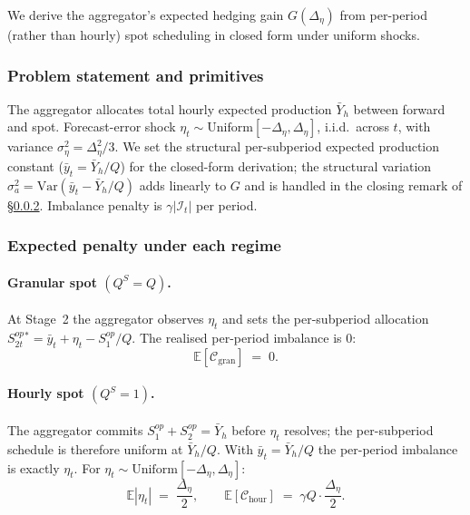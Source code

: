 \documentclass[11pt,a4paper]{article}
\theoremstyle{definition}
\theoremstyle{remark}
\theoremstyle{plain}
\begin{document}
We derive the aggregator's expected hedging gain $G(\Delta_\eta)$ from per-period (rather than hourly) spot scheduling in closed form under uniform shocks.

\subsubsection{Problem statement and primitives}\label{sec:aggregator-app:problem}
The aggregator allocates total hourly expected production $\bar Y_h$ between forward and spot. Forecast-error shock $\eta_t \sim \mathrm{Uniform}[-\Delta_\eta, \Delta_\eta]$, i.i.d.\ across $t$, with variance $\sigma_\eta^2 = \Delta_\eta^2/3$. We set the structural per-subperiod expected production constant ($\bar y_t = \bar Y_h/Q$) for the closed-form derivation; the structural variation $\sigma_a^2 = \mathrm{Var}(\bar y_t - \bar Y_h/Q)$ adds linearly to $G$ and is handled in the closing remark of \S\ref{sec:aggregator-app:gain}. Imbalance penalty is $\gamma|\mathcal{I}_t|$ per period.

\subsubsection{Expected penalty under each regime}\label{sec:aggregator-app:gain}
\paragraph{Granular spot $(Q^S = Q)$.} At Stage~2 the aggregator observes $\eta_t$ and sets the per-subperiod allocation $S_{2t}^{op}{}^* = \bar y_t + \eta_t - S_1^{op}/Q$. The realised per-period imbalance is $0$:
\[
\mathbb{E}[\mathcal{C}_{\text{gran}}] \;=\; 0.
\]

\paragraph{Hourly spot $(Q^S = 1)$.} The aggregator commits $S_1^{op} + S_2^{op} = \bar Y_h$ before $\eta_t$ resolves; the per-subperiod schedule is therefore uniform at $\bar Y_h/Q$. With $\bar y_t = \bar Y_h/Q$ the per-period imbalance is exactly $\eta_t$. For $\eta_t \sim \mathrm{Uniform}[-\Delta_\eta, \Delta_\eta]$:
\[
\mathbb{E}|\eta_t| \;=\; \dfrac{\Delta_\eta}{2}, \qquad \mathbb{E}[\mathcal{C}_{\text{hour}}] \;=\; \gamma Q \cdot \dfrac{\Delta_\eta}{2}.
\]
\end{document}
